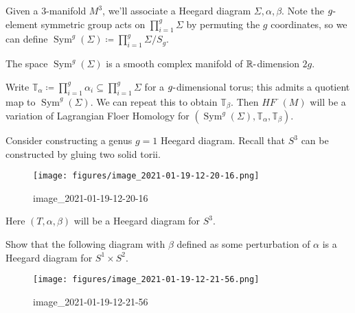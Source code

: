 Given a 3-manifold \(M^3\), we'll associate a Heegard diagram
\(\Sigma, \alpha, \beta\). Note the \(g{\hbox{-}}\)element symmetric
group acts on \(\prod_{i=1}^g \Sigma\) by permuting the \(g\)
coordinates, so we can define
\(\operatorname{Sym}^g(\Sigma) \coloneqq\prod_{i=1}^g \Sigma / S_g\).

\begin{theorem}[?]

The space \(\operatorname{Sym}^g(\Sigma)\) is a smooth complex manifold
of \({\mathbb{R}}{\hbox{-}}\)dimension \(2g\).

\end{theorem}

Write
\({\mathbb{T}}_{\alpha} \coloneqq\prod_{i=1}^g \alpha_i \subseteq \prod_{i=1}^g \Sigma\)
for a \(g{\hbox{-}}\)dimensional torus; this admits a quotient map to
\(\operatorname{Sym}^g(\Sigma)\). We can repeat this to obtain
\({\mathbb{T}}_{\beta}\). Then \(HF^{\,\cdot\,}(M)\) will be a variation
of Lagrangian Floer Homology for
\((\operatorname{Sym}^g(\Sigma), {\mathbb{T}}_{\alpha}, {\mathbb{T}}_{\beta} )\).

\begin{example}[?]

Consider constructing a genus \(g=1\) Heegard diagram. Recall that
\(S^3\) can be constructed by gluing two solid torii.

\begin{figure}
\centering
\texttt{[image: figures/image\_2021-01-19-12-20-16.png]}
\caption{image\_2021-01-19-12-20-16}
\end{figure}

Here \((T, \alpha, \beta)\) will be a Heegard diagram for \(S^3\).

\end{example}

\begin{exercise}[?]

Show that the following diagram with \(\beta\) defined as some
perturbation of \(\alpha\) is a Heegard diagram for \(S^1 \times S^2\).

\begin{figure}
\centering
\texttt{[image: figures/image\_2021-01-19-12-21-56.png]}
\caption{image\_2021-01-19-12-21-56}
\end{figure}

\end{exercise}

